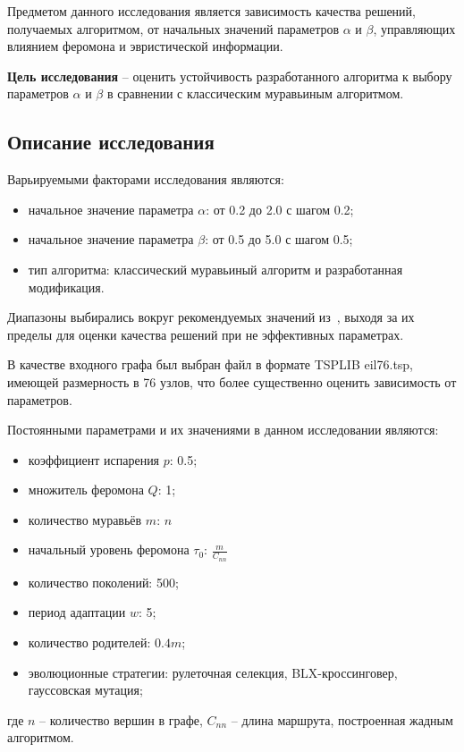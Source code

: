Предметом данного исследования является зависимость качества решений, получаемых алгоритмом, от начальных значений параметров $\alpha$ и $\beta$, управляющих влиянием феромона и эвристической информации.

\textbf{Цель исследования} -- оценить устойчивость разработанного алгоритма к выбору параметров $\alpha$ и $\beta$ в сравнении с классическим муравьиным алгоритмом.

\subsection{Описание исследования}

Варьируемыми факторами исследования являются:

\begin{itemize}
	\item начальное значение параметра $\alpha$: от 0.2 до 2.0 с шагом 0.2;
	\item начальное значение параметра $\beta$: от 0.5 до 5.0 с шагом 0.5;
	\item тип алгоритма: классический муравьиный алгоритм и разработанная модификация.
\end{itemize}

Диапазоны выбирались вокруг рекомендуемых значений из~\cite{dorigo-ant-book}, выходя за их пределы для оценки качества решений при не эффективных параметрах.

В качестве входного графа был выбран файл в формате TSPLIB eil76.tsp, имеющей размерность в 76 узлов, что более существенно оценить зависимость от параметров.

Постоянными параметрами и их значениями в данном исследовании являются: 
\begin{itemize}
	\item коэффициент испарения $p$: 0.5;
	\item множитель феромона $Q$: 1;
	\item количество муравьёв $m$: $n$
	\item начальный уровень феромона $\tau_0$: $\frac{m}{C_{nn}}$
	\item количество поколений: 500;
	\item период адаптации $w$: 5;
	\item количество родителей: $0.4m$;
	\item эволюционные стратегии: рулеточная селекция, BLX-кроссинговер, гауссовская мутация;
\end{itemize}
где $n$ -- количество вершин в графе, $C_{nn}$ -- длина маршрута, построенная жадным алгоритмом.


